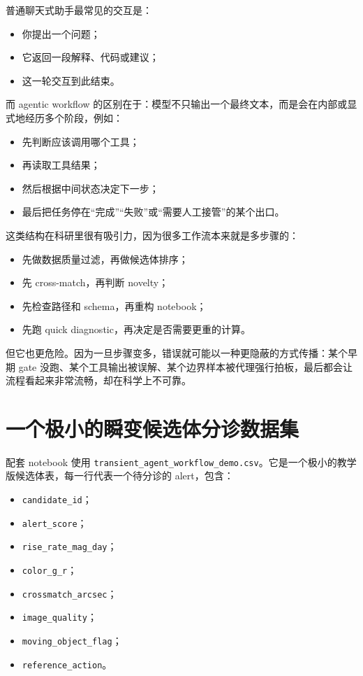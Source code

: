 普通聊天式助手最常见的交互是：

\begin{itemize}
    \item 你提出一个问题；
    \item 它返回一段解释、代码或建议；
    \item 这一轮交互到此结束。
\end{itemize}

而 agentic workflow 的区别在于：模型不只输出一个最终文本，而是会在内部或显式地经历多个阶段，例如：

\begin{itemize}
    \item 先判断应该调用哪个工具；
    \item 再读取工具结果；
    \item 然后根据中间状态决定下一步；
    \item 最后把任务停在“完成”“失败”或“需要人工接管”的某个出口。
\end{itemize}

这类结构在科研里很有吸引力，因为很多工作流本来就是多步骤的：

\begin{itemize}
    \item 先做数据质量过滤，再做候选体排序；
    \item 先 cross-match，再判断 novelty；
    \item 先检查路径和 schema，再重构 notebook；
    \item 先跑 quick diagnostic，再决定是否需要更重的计算。
\end{itemize}

但它也更危险。因为一旦步骤变多，错误就可能以一种更隐蔽的方式传播：某个早期 gate 没跑、某个工具输出被误解、某个边界样本被代理强行拍板，最后都会让流程看起来非常流畅，却在科学上不可靠。

\section{一个极小的瞬变候选体分诊数据集}

配套 notebook 使用 \nolinkurl{transient_agent_workflow_demo.csv}。它是一个极小的教学版候选体表，每一行代表一个待分诊的 alert，包含：

\begin{itemize}
    \item \texttt{candidate\_id}；
    \item \texttt{alert\_score}；
    \item \texttt{rise\_rate\_mag\_day}；
    \item \texttt{color\_g\_r}；
    \item \texttt{crossmatch\_arcsec}；
    \item \texttt{image\_quality}；
    \item \texttt{moving\_object\_flag}；
    \item \texttt{reference\_action}。
\end{itemize}

